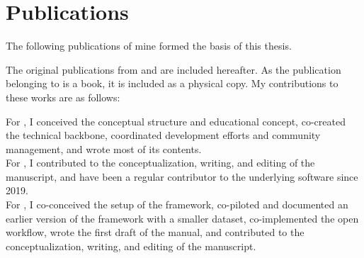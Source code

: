 
\chapter{Publications}

The following publications of mine formed the basis of this thesis.



\begin{refsection}
\nocite{Halchenko2021, wagner2020datalad, wagner2022fairly}
\begin{refcontext}[sorting=nyt]  
	\printbibliography[heading=none, resetnumbers=true]
\end{refcontext}

The original publications from \citep{Halchenko2021} and \citep{wagner2022fairly} are included hereafter.
As the publication belonging to \citep{wagner2020datalad} is a book, it is included as a physical copy.
My contributions to these works are as follows:

For \citet{wagner2020datalad}, I conceived the conceptual structure and educational concept, co-created the technical backbone, coordinated development efforts and community management, and wrote most of its contents.\\
For \citet{Halchenko2021}, I contributed to the conceptualization, writing, and editing of the manuscript, and have been a regular contributor to the underlying software since 2019.\\
For \citet{wagner2022fairly}, I co-conceived the setup of the framework, co-piloted and documented an earlier version of the framework with a smaller dataset, co-implemented the open workflow, wrote the first draft of the manual, and contributed to the conceptualization, writing, and editing of the manuscript.



\end{refsection}
